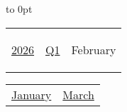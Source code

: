 \vbox to 0pt{}


\pagebreak
{\noindent\Large\renewcommand{\arraystretch}{\myNumArrayStretch}\begin{tabular}{|l|l|l}
\hyperlink{2026}{2026} & \hyperlink{Q1}{Q1} & \hypertarget{February}{February}
\end{tabular}\hfill%
\begin{tabular}{r|r@{}}
\hyperlink{January}{January} & \hyperlink{March}{March}
\end{tabular}}
\myLineThick\medskip

{%

\setlength{\tabcolsep}{\myLenTabColSep}%
%
\begin{tabularx}{\linewidth}{|l!{\vrule width \myLenLineThicknessThick}*{7}{@{}X@{}|}}
  

\end{tabularx}}
